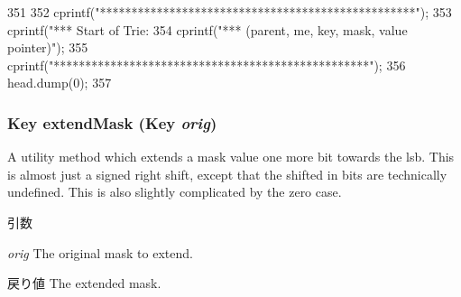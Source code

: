 \begin{DoxyCode}
351     {
352         cprintf("**************************************************\n");
353         cprintf("*** Start of Trie: %
354         cprintf("*** (parent, me, key, mask, value pointer)\n");
355         cprintf("**************************************************\n");
356         head.dump(0);
357     }
\end{DoxyCode}
\hypertarget{classTrie_a09c7054156a02051d58b05d11555150a}{
\subsubsection[{extendMask}]{\setlength{\rightskip}{0pt plus 5cm}Key extendMask (Key {\em orig})}}
\label{classTrie_a09c7054156a02051d58b05d11555150a}
A utility method which extends a mask value one more bit towards the lsb. This is almost just a signed right shift, except that the shifted in bits are technically undefined. This is also slightly complicated by the zero case. 
\begin{DoxyParams}{引数}
\item[{\em orig}]The original mask to extend. \end{DoxyParams}
\begin{DoxyReturn}{戻り値}
The extended mask. 
\end{DoxyReturn}



